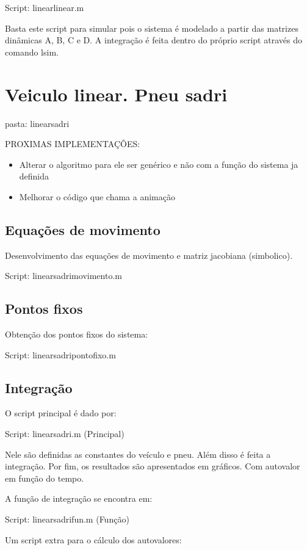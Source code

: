 \documentclass[sublist]{fei}
\begin{document}
Script: linearlinear.m

Basta este script para simular pois o sistema é modelado a partir das matrizes dinâmicas A, B, C e D. A integração é feita dentro do próprio script através do comando lsim.

\chapter{Veiculo linear. Pneu sadri} 

pasta: linearsadri

PROXIMAS IMPLEMENTAÇÕES:

\begin{itemize}
\item Alterar o algoritmo para ele ser genérico e não com a função do sistema ja definida
\item Melhorar o código que chama a animação
\end{itemize}

\section{Equações de movimento}

Desenvolvimento das equações de movimento e matriz jacobiana (simbolico).

Script: linearsadrimovimento.m

\section{Pontos fixos}

Obtenção dos pontos fixos do sistema:

Script: linearsadripontofixo.m

\section{Integração}

O script principal é dado por:

Script: linearsadri.m (Principal)

Nele são definidas as constantes do veículo e pneu. Além disso é feita a integração. Por fim, os resultados são apresentados em gráficos. Com autovalor em função do tempo.

A função de integração se encontra em:

Script: linearsadrifun.m (Função)

Um script extra para o cálculo dos autovalores:
\end{document}
